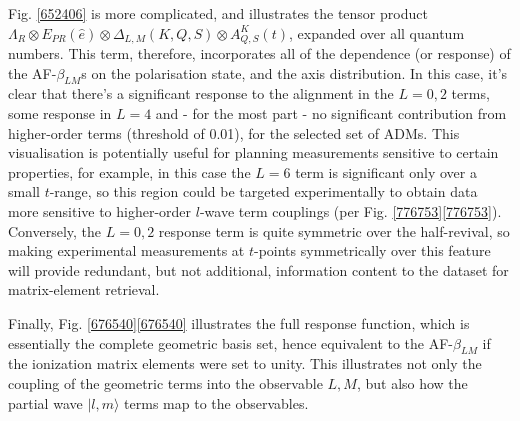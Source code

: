 Fig. \ref{652406} is more complicated, and illustrates the tensor product $\Lambda_{R}\otimes E_{PR}(\hat{e})\otimes \Delta_{L,M}(K,Q,S)\otimes A^{K}_{Q,S}(t)$, expanded over all quantum numbers.
This term, therefore, incorporates all of the dependence (or response) of the AF-$\beta_{LM}$s on the polarisation state, and the axis distribution. In this case, it's clear that there's a significant response to the alignment in the $L=0,2$ terms, some response in $L=4$ and - for the most part - no significant contribution from higher-order terms (threshold of 0.01), for the selected set of ADMs. This visualisation is potentially useful for planning measurements sensitive to certain properties, for example, in this case the $L=6$ term is significant only over a small $t$-range, so this region could be targeted experimentally to obtain data more sensitive to higher-order $l$-wave term couplings (per Fig. \ref{776753}\ref{776753}). Conversely, the $L=0,2$ response term is quite symmetric over the half-revival, so making experimental measurements at $t$-points symmetrically over this feature will provide redundant, but not additional, information content to the dataset for matrix-element retrieval.

Finally, Fig. \ref{676540}\ref{676540} illustrates the full response function, which is essentially the complete geometric basis set,
hence equivalent to the AF-$\beta_{LM}$ if the ionization matrix elements were set to unity. This illustrates not only the coupling of the geometric terms into the observable $L,M$, but also how the partial wave $|l,m\rangle$ terms map to the observables. 
